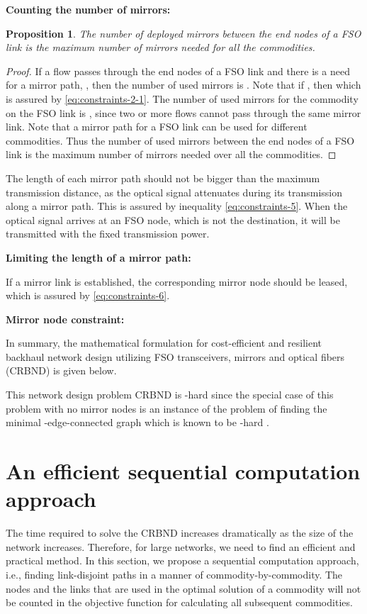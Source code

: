 \documentclass[onecolumn,11pt,draftclsnofoot]{IEEEtran}
\newtheorem{proposition}{Proposition}
\begin{document}
\noindent \textbf{Counting the number of mirrors:}


\begin{proposition}\label{pp:mirrorNum}
The number of deployed mirrors between the end nodes of a FSO link is the maximum number of mirrors needed for all the commodities.
\end{proposition}
\begin{proof}
If a flow passes through the end nodes of a FSO link  and there is a need for
a mirror path, , then the number of used mirrors is . Note that if , then  which is assured by \eqref{eq:constraints-2-1}.
The number of used mirrors for the commodity on the FSO link  is , since two or more flows cannot pass through the same mirror link.
Note that a mirror path for a FSO link can be used for different commodities. Thus the number of used mirrors between the end nodes of a FSO link is the maximum number of mirrors needed over all the commodities.
\end{proof}

The length of each mirror path should not be bigger than the maximum transmission distance, as the optical signal attenuates during its transmission along a mirror path. This is assured by inequality \eqref{eq:constraints-5}. When the optical signal arrives at an FSO node, which is not the destination, it will be transmitted with the fixed transmission power.

\noindent \textbf{Limiting the length of a mirror path:}


If a mirror link is established, the corresponding mirror node should be leased, which is assured by \eqref{eq:constraints-6}.

\noindent \textbf{Mirror node constraint:}


In summary, the mathematical formulation for cost-efficient and resilient backhaul network design utilizing FSO transceivers, mirrors and optical fibers (CRBND) is given below.


This network design problem CRBND is -hard since the special case of this problem with no mirror nodes is an instance of the problem of finding the minimal -edge-connected graph which is known to be -hard \cite{Garey1980}.

\section{An efficient sequential computation approach}\label{sec:approach}
The time required to solve the CRBND increases dramatically as the size of the network increases. Therefore, for large networks, we need to find an efficient and practical method. In this section, we propose a sequential computation approach, i.e., finding  link-disjoint paths in a manner of commodity-by-commodity. The nodes and the links that are used in the optimal solution of  a commodity will not be counted in the objective function for calculating all subsequent commodities.
\end{document}
